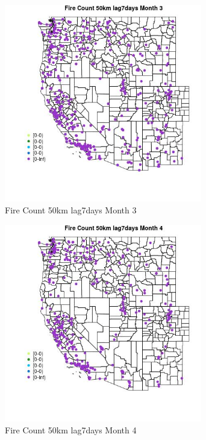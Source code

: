 \begin{figure} 
\centering  
\includegraphics[width=0.77\textwidth]{Code_Outputs/Report_ML_input_PM25_Step4_part_e_de_duplicated_aves_compiled_2019-05-18wNAs_MapObsMo3Fire_Count_50km_lag7days.jpg} 
\caption{\label{fig:Report_ML_input_PM25_Step4_part_e_de_duplicated_aves_compiled_2019-05-18wNAsMapObsMo3Fire_Count_50km_lag7days}Fire Count 50km lag7days Month 3} 
\end{figure} 
 

\begin{figure} 
\centering  
\includegraphics[width=0.77\textwidth]{Code_Outputs/Report_ML_input_PM25_Step4_part_e_de_duplicated_aves_compiled_2019-05-18wNAs_MapObsMo4Fire_Count_50km_lag7days.jpg} 
\caption{\label{fig:Report_ML_input_PM25_Step4_part_e_de_duplicated_aves_compiled_2019-05-18wNAsMapObsMo4Fire_Count_50km_lag7days}Fire Count 50km lag7days Month 4} 
\end{figure} 
 

